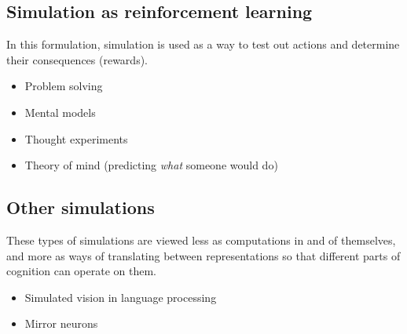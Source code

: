 \documentclass[12pt]{article}
\begin{document}
\subsection*{Simulation as reinforcement learning}

In this formulation, simulation is used as a way to test out actions and determine their consequences (rewards).

\begin{itemize}
\item Problem solving \citep{Shepard1971,Just1976,Finke1988,Kosslyn2006,Hegarty2004}
\item Mental models \citep{Gentner1983,Kuipers1986,Forbus2011,Johnson-Laird2012,Khemlani2013}
\item Thought experiments \citep{Gendler1998,Trickett2007,Clement2009,Brown2014}
\item Theory of mind (predicting \textit{what} someone would do) \citep{Goldman1992,Stich1992,Gopnik1992,Gordon1992}
\end{itemize}

\subsection*{Other simulations}

These types of simulations are viewed less as computations in and of themselves, and more as ways of translating between representations so that different parts of cognition can operate on them.

\begin{itemize}
\item Simulated vision in language processing \citep{Matlock2004,Bergen2007,Fischer2008}
\item Mirror neurons \citep{Gallese1998}
\end{itemize}

\end{document}
